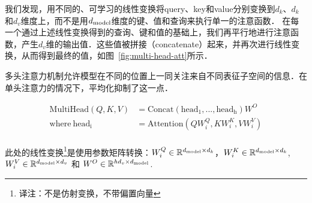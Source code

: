 我们发现，用不同的、可学习的线性变换将query、key和value分别变换到$d_k$、$d_k$和$d_v$维度上，而不是用$d_{\text{model}}$维度的键、值和查询来执行单一的注意函数．
在每一个通过上述线性变换得到的查询、键和值的基础上，我们再平行地进行注意函数，产生$d_v$维的输出值．这些值被拼接（concatenate）起来，并再次进行线性变换，从而得到最终的值，如图~\ref{fig:multi-head-att}所示．

多头注意力机制允许模型在不同的位置上一同关注来自不同表征子空间的信息．在单头注意力的情况下，平均化抑制了这一点．

\begin{align*}
    \mathrm{MultiHead}(Q, K, V) &= \mathrm{Concat}(\mathrm{head_1}, ..., \mathrm{head_h})W^O\\
    \text{where}~\mathrm{head_i} &= \mathrm{Attention}(QW^Q_i, KW^K_i, VW^V_i)\\
\end{align*}

此处的线性变换\footnote{译注：不是仿射变换，不带偏置向量}是使用参数矩阵转换：$W^Q_i \in \mathbb{R}^{d_{\text{model}} \times d_k}$，$W^K_i \in \mathbb{R}^{d_{\text{model}} \times d_k}$, $W^V_i \in \mathbb{R}^{d_{\text{model}} \times d_v}$ 和 $W^O \in \mathbb{R}^{hd_v \times d_{\text{model}}}$.





